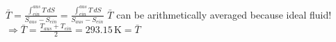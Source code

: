 \( \bar{T} = \frac{\int_{ein}^{aus} T \, dS}{S_{aus} - S_{ein}} = \frac{\int_{ein}^{aus} T \, dS}{S_{aus} - S_{ein}} \)  
\( \bar{T} \) can be arithmetically averaged because ideal fluid!  
\( \Rightarrow \bar{T} = \frac{T_{aus} + T_{ein}}{2} = 293.15 \, \text{K} = \bar{T} \)